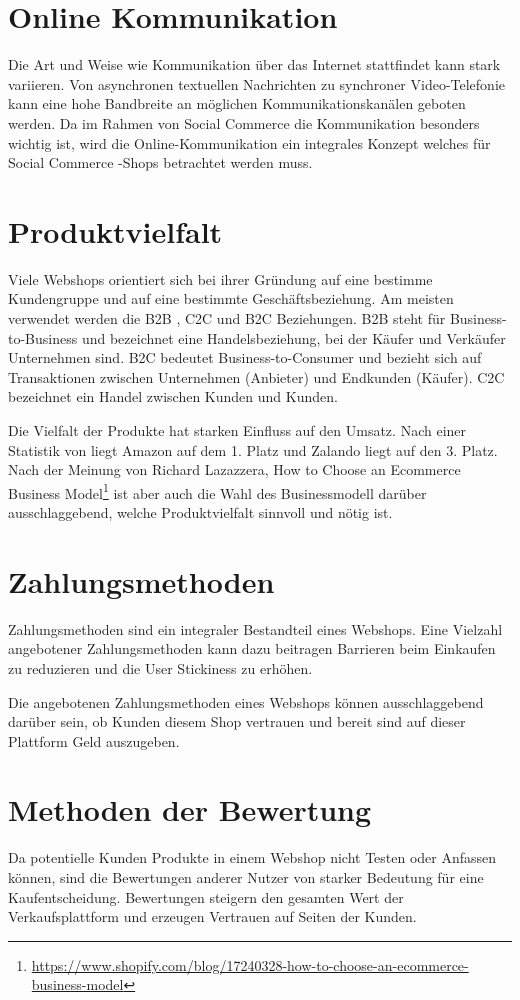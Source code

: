 \section{Online Kommunikation}

Die Art und Weise wie Kommunikation über das Internet stattfindet kann stark variieren. Von asynchronen textuellen Nachrichten zu synchroner Video-Telefonie kann eine hohe Bandbreite an möglichen Kommunikationskanälen geboten werden. Da im Rahmen von Social Commerce die Kommunikation besonders wichtig ist, wird die Online-Kommunikation ein integrales Konzept welches für Social Commerce -Shops betrachtet werden muss.


\section{Produktvielfalt}

Viele Webshops orientiert sich bei ihrer Gründung auf eine bestimme Kundengruppe und auf eine bestimmte Geschäftsbeziehung. Am meisten verwendet werden die B2B , C2C und B2C Beziehungen. B2B steht für Business-to-Business und bezeichnet eine Handelsbeziehung, bei der Käufer und Verkäufer Unternehmen sind. B2C bedeutet Business-to-Consumer und bezieht sich auf Transaktionen zwischen Unternehmen (Anbieter) und Endkunden (Käufer). C2C bezeichnet ein Handel zwischen Kunden und Kunden.

Die Vielfalt der Produkte hat starken Einfluss auf den Umsatz. Nach einer Statistik von \textcite{statista} liegt Amazon auf dem 1. Platz und Zalando liegt auf den 3. Platz. Nach der Meinung von Richard Lazazzera, How to Choose an Ecommerce Business Model\footnote{\url{https://www.shopify.com/blog/17240328-how-to-choose-an-ecommerce-business-model}} ist aber auch die Wahl des Businessmodell darüber ausschlaggebend, welche Produktvielfalt sinnvoll und nötig ist.


\section{Zahlungsmethoden}

Zahlungsmethoden sind ein integraler Bestandteil eines Webshops. Eine Vielzahl angebotener Zahlungsmethoden kann dazu beitragen Barrieren beim Einkaufen zu reduzieren und die User Stickiness zu erhöhen.

Die angebotenen Zahlungsmethoden eines Webshops können ausschlaggebend darüber sein, ob Kunden diesem Shop vertrauen und bereit sind auf dieser Plattform Geld auszugeben.


\section{Methoden der Bewertung}

Da potentielle Kunden Produkte in einem Webshop nicht Testen oder Anfassen können, sind die Bewertungen anderer Nutzer von starker Bedeutung für eine Kaufentscheidung. Bewertungen steigern den gesamten Wert der Verkaufsplattform und erzeugen Vertrauen auf Seiten der Kunden.
